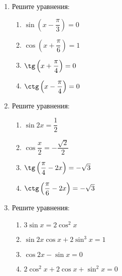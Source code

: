 \documentclass[12pt, a4paper]{article}
\begin{document}
	
	\begin{enumerate}
		\item Решите уравнения:
		\begin{multicols}{2}
			\begin{enumerate}[label=\asbuk*)]
			\item $\sin\left(x-\dfrac{\pi}{3} \right)=0 $
			\item $\cos\left(x+\dfrac{\pi}{6} \right)=1 $
			\item $\tg\left( x+\dfrac{\pi}{4} \right)=0 $
			\item $\ctg\left(x-\dfrac{\pi}{4} \right)=0 $
		\end{enumerate}
		\end{multicols}
		\item Решите уравнения:
		\begin{multicols}{2}
			\begin{enumerate}[label=\asbuk*)]
			\item $\sin2x=\dfrac{1}{2}$
			\item $\cos\dfrac{x}{2}=-\dfrac{\sqrt{2}}{2}$
			\item $\tg\left(\dfrac{\pi}{4}-2x \right)=-\sqrt{3} $
			\item $\ctg\left(\dfrac{\pi}{6}-2x \right)=-\sqrt{3} $
		\end{enumerate}
		\end{multicols}
		\item Решите уравнения:
		\begin{multicols}{2}
			\begin{enumerate}[label=\asbuk*)]
			\item $3\sin x=2\cos^2x$
			\item $\sin2x\cos x+2\sin^3x=1$
			\item $\cos2x-\sin x=0$
			\item $2\cos^2x+2\cos x+\sin^2x=0$
			\end{enumerate}
		\end{multicols}
	\end{enumerate}
\end{document}
